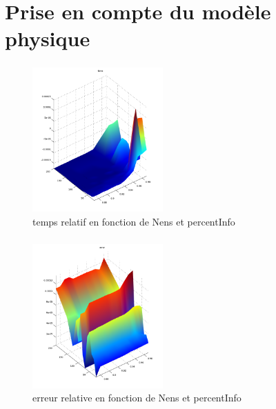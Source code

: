 \documentclass[slidetop,11pt]{beamer}
\begin{document}
\section{Prise en compte du modèle physique}
\begin{frame}
  \frametitle{}
  \begin{figure}
  \begin{center}
    \caption{temps relatif en fonction de Nens et percentInfo}
    \includegraphics[width=5cm]{time2_1.png}
  \end{center}
  \end{figure}
\end{frame}
\begin{frame}
  \frametitle{}
  \begin{figure}
  \begin{center}
    \caption{erreur relative en fonction de Nens et percentInfo}
    \includegraphics[width=5cm]{error2_1.png}
  \end{center}
  \end{figure}
\end{frame}
\end{document}
